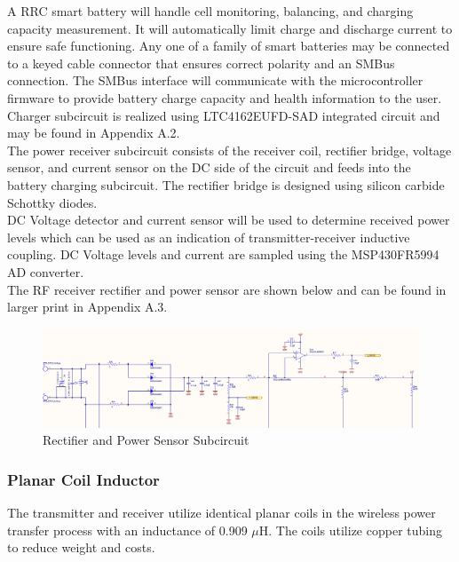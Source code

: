\documentclass[12pt]{article}
\begin{document}
\indent
A RRC smart battery will handle cell monitoring, balancing, and charging capacity measurement. It will automatically limit charge and discharge current to ensure safe functioning. Any one of a family of smart batteries may be connected to a keyed cable connector that ensures correct polarity and an SMBus connection. The SMBus interface will communicate with the microcontroller firmware to provide battery charge capacity and health information to the user.\\

\indent
Charger subcircuit is realized using LTC4162EUFD-SAD integrated circuit and may be found in Appendix A.2.\\

\indent
The power receiver subcircuit consists of the receiver coil, rectifier bridge, voltage sensor, and current sensor on the DC side of the circuit and feeds into the battery charging subcircuit. The rectifier bridge is designed using silicon carbide Schottky diodes.\\

\indent
DC Voltage detector and current sensor will be used to determine received power levels which can be used as an indication of transmitter-receiver inductive coupling. DC Voltage levels and current are sampled using the MSP430FR5994 AD converter.\\

\indent
The RF receiver rectifier and power sensor are shown below and can be found in larger print in Appendix A.3.%

\hfill

\begin{figure}[h!]
\centering
\includegraphics[width=0.88\linewidth]{rx_dc_rf_conv}
\caption{Rectifier and Power Sensor Subcircuit}
\end{figure}

\hfill

\pagebreak

\subsubsection{Planar Coil Inductor} The transmitter and receiver utilize identical planar coils in the wireless power transfer process with an inductance of 0.909 $\mu$H. The coils utilize copper tubing to reduce weight and costs. \\
\end{document}
